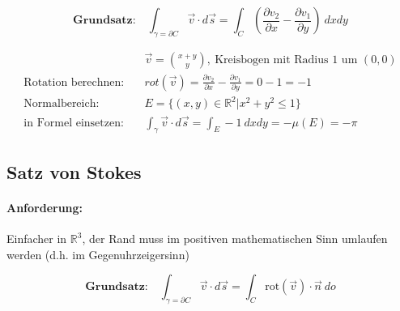 \documentclass[11pt]{article}
\begin{document}
\begin{equation*}
	\textbf{Grundsatz:}\quad\int_{\gamma = \partial C} \vec{v} \cdot d\vec{s} = \int_C (\frac{\partial v_2}{\partial x}-\frac{\partial v_1}{\partial y})\ dxdy
\end{equation*}

\begin{equation*}
\begin{split}
	& \vec{v} = \binom{x+y}{y},\ \text{Kreisbogen mit Radius $1$ um $(0,0)$} \\
	\text{Rotation berechnen:}\quad & rot(\vec{v}) = \frac{\partial v_2}{\partial x}-\frac{\partial v_1}{\partial y} = 0 -1 = -1 \\
	\text{Normalbereich:}\quad & E = \{(x,y) \in \mathbb{R}^2 | x^2 + y^2 \leq 1 \} \\
	\text{in Formel einsetzen:}\quad & \int_\gamma \vec{v} \cdot d\vec{s} = \int_E -1\ dxdy = -\mu(E) = -\pi
\end{split}
\end{equation*}

\subsection{Satz von Stokes}

\paragraph{Anforderung:} Einfacher in $\mathbb{R}^3$, der Rand muss im positiven mathematischen Sinn umlaufen werden (d.h. im Gegenuhrzeigersinn)

\begin{equation*}
	\textbf{Grundsatz:}\quad\int_{\gamma = \partial C} \vec{v} \cdot d\vec{s} = \int_C \text{rot}(\vec{v}) \cdot \vec{n}\ do
\end{equation*}
\end{document}
